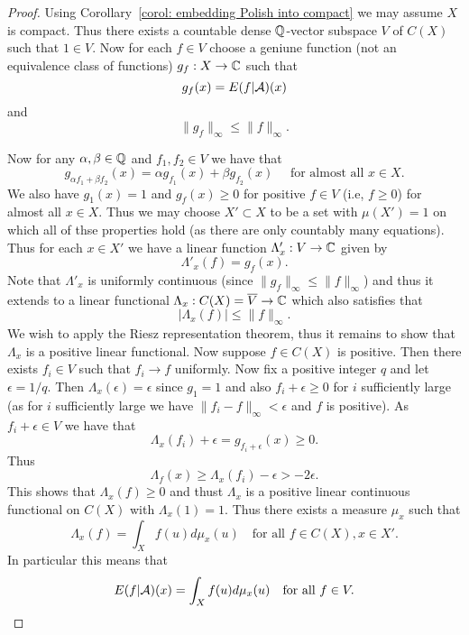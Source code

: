 \documentclass[twoside, a4paper, 10pt]{amsart}
\begin{document}
\begin{proof} Using Corollary~\ref{corol: embedding Polish into compact} we may assume $X$ is compact. Thus there exists a countable dense $\mathbb{Q}$-vector subspace $V$ of $C(X)$ such that $1 \in V$. Now for each $f \in V$ choose a geniune function (not an equivalence class of functions) $g_f:X \to \mathbb{C}$ such that $$g_f(x) = E(f|\mathcal{A})(x)$$ and $$\|g_f\|_{\infty} \leq \|f\|_{\infty}.$$

 Now for any $\alpha,\beta \in \mathbb{Q}$ and $f_1,f_2 \in V$ we have that $$g_{\alpha f_1 + \beta f_2}(x) = \alpha g_{f_1}(x) + \beta g_{f_2}(x)\quad \text{ for almost all } x \in X.$$ We also have $g_1(x) = 1$ and $g_f(x) \geq 0$ for positive $f \in V$ (i.e, $f\geq 0$) for almost all $x \in X$. Thus we may choose $X' \subset X$ to be a set with $\mu(X')=1$ on which all of thse properties hold (as there are only countably many equations). Thus for each $x \in X'$ we have a linear function $\Lambda'_x: V \to \mathbb{C}$ given by $$\Lambda'_x (f)= g_f(x).$$ Note that $\Lambda'_x$ is uniformly continuous (since $\|g_f\|_{\infty} \leq \|f\|_{\infty}$) and thus it extends to a linear functional $\Lambda_x:C(X) = \overline{V} \to \mathbb{C}$ which also satisfies that $$|\Lambda_x (f)| \leq \|f\|_{\infty}.$$ We wish to apply the Riesz representation theorem, thus it remains to show that $\Lambda_x$ is a positive linear functional. Now suppose $f \in C(X)$ is positive. Then there exists $f_i \in V$ such that $f_i \to f$ uniformly. Now fix a positive integer $q$ and let $\epsilon = 1/q$. Then $\Lambda_x(\epsilon) = \epsilon$ since $g_1=1$ and also $f_i + \epsilon \geq 0$ for $i$ sufficiently large (as for $i$ sufficiently large we have $\|f_i - f\|_{\infty} < \epsilon$ and $f$ is positive). As $f_i + \epsilon \in V$ we have that $$\Lambda_x(f_i) + \epsilon = g_{f_i + \epsilon}(x) \geq 0.$$ Thus $$\Lambda_f(x) \geq \Lambda_x(f_i) - \epsilon> -2\epsilon.$$ This shows that $\Lambda_x(f) \geq 0$ and thust $\Lambda_x$ is a positive linear continuous functional on $C(X)$ with $\Lambda_x(1)=1$. Thus there exists a measure $\mu_x$ such that $$\Lambda_x(f) = \int_X f(u) d\mu_x(u) \quad \text{for all } f \in C(X), x \in X'.$$ In particular this means that $$ E(f|\mathcal{A})(x) = \int_X f(u) d\mu_x(u) \quad \text{for all } f \in V.$$


\end{proof}
\end{document}
